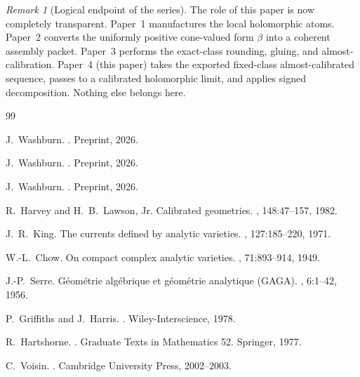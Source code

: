 \documentclass[11pt]{article}
\numberwithin{equation}{section}
\theoremstyle{plain}
\theoremstyle{definition}
\theoremstyle{remark}
\newtheorem{remark}[theorem]{Remark}
\begin{document}
\begin{remark}[Logical endpoint of the series]
The role of this paper is now completely transparent. Paper~1 manufactures the local holomorphic atoms. Paper~2 converts the uniformly positive cone-valued form $\beta$ into a coherent assembly packet. Paper~3 performs the exact-class rounding, gluing, and almost-calibration. Paper~4 (this paper) takes the exported fixed-class almost-calibrated sequence, passes to a calibrated holomorphic limit, and applies signed decomposition. Nothing else belongs here.
\end{remark}

\begin{thebibliography}{99}

J.~Washburn.
.
\newblock Preprint, 2026.

J.~Washburn.
.
\newblock Preprint, 2026.

J.~Washburn.
.
\newblock Preprint, 2026.

R.~Harvey and H.~B.~Lawson, Jr.
\newblock Calibrated geometries.
, 148:47--157, 1982.

J.~R.~King.
\newblock The currents defined by analytic varieties.
, 127:185--220, 1971.

W.-L.~Chow.
\newblock On compact complex analytic varieties.
, 71:893--914, 1949.

J.-P.~Serre.
\newblock G\'eom\'etrie alg\'ebrique et g\'eom\'etrie analytique ({GAGA}).
, 6:1--42, 1956.

P.~Griffiths and J.~Harris.
.
\newblock Wiley-Interscience, 1978.

R.~Hartshorne.
.
\newblock Graduate Texts in Mathematics 52. Springer, 1977.

C.~Voisin.
.
\newblock Cambridge University Press, 2002--2003.

\end{thebibliography}
\end{document}
